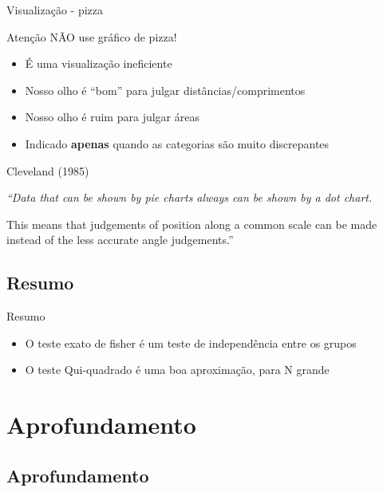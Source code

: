 \documentclass{beamer}
\begin{document}
\begin{frame}{\scriptsize Visualização - pizza}
  \begin{block}{Atenção}
    NÃO use gráfico de pizza!
  \end{block}
  \begin{itemize}
    \footnotesize
  \item É uma visualização ineficiente
  \item Nosso olho é ``bom'' para julgar distâncias/comprimentos
  \item Nosso olho é ruim para julgar áreas
  \item Indicado {\bf apenas} quando as categorias são muito discrepantes
  \end{itemize}
  \begin{block}{Cleveland (1985)}
    \small
    {\em ``Data that can be shown by pie charts always can be shown by a dot chart.

      This means that judgements of position along a common scale can be made instead of the less accurate angle judgements.''}
  \end{block}
\end{frame}

\subsection{Resumo}

\begin{frame}{\scriptsize Resumo}
  \begin{itemize}
  \item O teste exato de fisher é um teste de independência entre os grupos
  \item O teste Qui-quadrado é uma boa aproximação, para N grande
  \end{itemize}
\end{frame}

\section{Aprofundamento}

\subsection{Aprofundamento}
\end{document}
